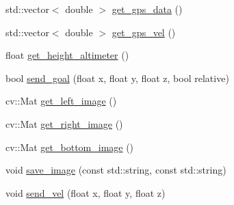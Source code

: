 \begin{DoxyCompactItemize}
\item 
std\-::vector$<$ double $>$ \hyperlink{class_staterobot_a31dcc23cfb620c95e58f3b5ad4bb6b6d}{get\-\_\-gps\-\_\-data} ()
\item 
std\-::vector$<$ double $>$ \hyperlink{class_staterobot_a3a9ee7a49cbb278ffc5f3b201dcae951}{get\-\_\-gps\-\_\-vel} ()
\item 
float \hyperlink{class_staterobot_a3e92b9d6f17c0812e8ed435602d1f717}{get\-\_\-height\-\_\-altimeter} ()
\item 
bool \hyperlink{class_staterobot_a4f1aff1c608a045faa07fa8b9cff4b65}{send\-\_\-goal} (float x, float y, float z, bool relative)
\item 
cv\-::\-Mat \hyperlink{class_staterobot_a5b0323154aa0a19ed82b02cfe7376974}{get\-\_\-left\-\_\-image} ()
\item 
cv\-::\-Mat \hyperlink{class_staterobot_ab1d8f9bfdbd766b96110c0a65fe08f43}{get\-\_\-right\-\_\-image} ()
\item 
cv\-::\-Mat \hyperlink{class_staterobot_a310b2c9315316f96054357ebb705438f}{get\-\_\-bottom\-\_\-image} ()
\item 
void \hyperlink{class_staterobot_a1da31a1c7a8f39878d2511ca86adeb8f}{save\-\_\-image} (const std\-::string, const std\-::string)
\item 
void \hyperlink{class_staterobot_addfc245d53239eed664812a50a916428}{send\-\_\-vel} (float x, float y, float z)
\end{DoxyCompactItemize}

